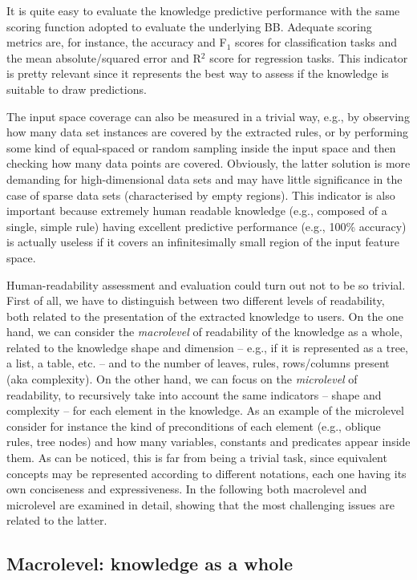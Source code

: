 \documentclass[sigconf]{acmart}
\begin{document}
It is quite easy to evaluate the knowledge predictive performance with the same scoring function adopted to evaluate the underlying BB.
%
Adequate scoring metrics are, for instance, the accuracy and F$_1$ scores for classification tasks and the mean absolute/squared error and R$^2$ score for regression tasks.
%
This indicator is pretty relevant since it represents the best way to assess if the knowledge is suitable to draw predictions.

The input space coverage can also be measured in a trivial way, e.g., by observing how many data set instances are covered by the extracted rules, or by performing some kind of equal-spaced or random sampling inside the input space and then checking how many data points are covered.
%
Obviously, the latter solution is more demanding for high-dimensional data sets and may have little significance in the case of sparse data sets (characterised by empty regions).
%
This indicator is also important because extremely human readable knowledge (e.g., composed of a single, simple rule) having excellent predictive performance (e.g., 100\% accuracy) is actually useless if it covers an infinitesimally small region of the input feature space.

Human-readability assessment and evaluation could turn out not to be so trivial.
%
First of all, we have to distinguish between two different levels of readability, both related to the presentation of the extracted knowledge to users.
%
On the one hand, we can consider the \emph{macrolevel} of readability of the knowledge as a whole, related to the knowledge shape and dimension -- e.g., if it is represented as a tree, a list, a table, etc. -- and to the number of leaves, rules, rows/columns present (aka complexity).
%
On the other hand, we can focus on the \emph{microlevel} of readability, to recursively take into account the same indicators -- shape and complexity -- for each element in the knowledge.
%
As an example of the microlevel consider for instance the kind of preconditions of each element (e.g., oblique rules, \mofn{} tree nodes) and how many variables, constants and predicates appear inside them.
%
As can be noticed, this is far from being a trivial task, since equivalent concepts may be represented according to different notations, each one having its own conciseness and expressiveness.
%
In the following both macrolevel and microlevel are examined in detail, showing that the most challenging issues are related to the latter.

\subsection{Macrolevel: knowledge as a whole}\label{ssec:macro}
\end{document}

